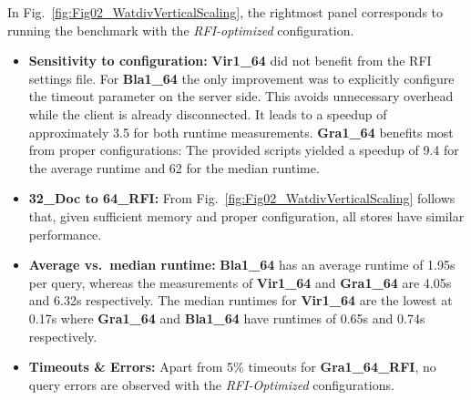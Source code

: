 %


In Fig.~\ref{fig:Fig02_WatdivVerticalScaling}, the rightmost panel corresponds to running the benchmark with the \emph{RFI-optimized} configuration.

%
%
%
\begin{itemize}
	\item \textbf{Sensitivity to configuration:} \textbf{Vir1\_64} did not benefit from the RFI settings file. For \textbf{Bla1\_64} the only improvement was to explicitly configure the timeout parameter on the server side. This avoids unnecessary overhead while the client is already disconnected. It leads to a speedup of approximately 3.5 for both runtime measurements. \textbf{Gra1\_64} benefits most from proper configurations: The provided scripts yielded a speedup of 9.4 for the average runtime and 62 for the median runtime.
	\item \textbf{32\_Doc to 64\_RFI:} From Fig.~\ref{fig:Fig02_WatdivVerticalScaling} follows that, given sufficient memory and proper configuration, all stores have similar performance.
	\item \textbf{Average vs.\ median runtime:} \textbf{Bla1\_64} has an average runtime of 1.95s per query, whereas the measurements of \textbf{Vir1\_64} and \textbf{Gra1\_64} are 4.05s and 6.32s respectively. The median runtimes for \textbf{Vir1\_64} are the lowest at 0.17s where \textbf{Gra1\_64} and \textbf{Bla1\_64} have runtimes of 0.65s and 0.74s respectively.
\item \textbf{Timeouts \& Errors:} Apart from 5\% timeouts for \textbf{Gra1\_64\_RFI}, no query errors are observed with the \emph{RFI-Optimized} configurations.
\end{itemize}


